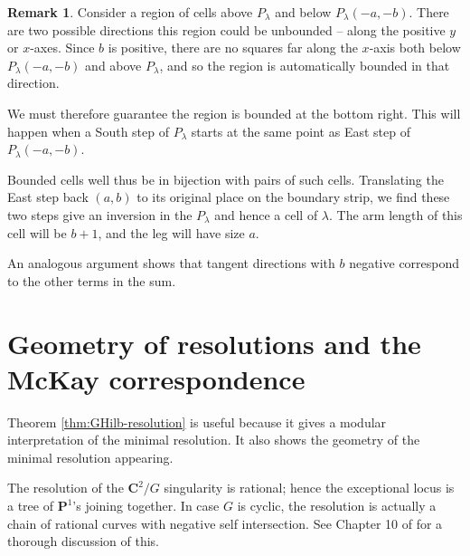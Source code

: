 \documentclass{amsart}[12pt]
\theoremstyle{definition}
\newtheorem{remark}[dummy]{Remark}
\newcommand{\C}{\mathbf{C}}
\newcommand{\proj}{\mathbf{P}}
\begin{document}
\begin{remark}
Consider a region of cells above $P_\lambda$ and below $P_\lambda(-a,-b)$.  There are two possible directions this region could be unbounded -- along the positive $y$ or $x$-axes.  Since $b$ is positive, there are no squares far along the $x$-axis both below $P_\lambda(-a,-b)$  and above $P_\lambda$, and so the region is automatically bounded in that direction.  

We must therefore guarantee the region is bounded at the bottom right.  This will happen when a South step of $P_\lambda$ starts at the same point as East step of $P_\lambda(-a,-b)$.  




Bounded cells well thus be in bijection with pairs of such cells.  Translating the East step back $(a,b)$ to its original place on the boundary strip, we find these two steps give an inversion in the $P_\lambda$ and hence a cell of $\lambda$.  The arm length of this cell will be $b+1$, and the leg will have size $a$. 

An analogous argument shows that tangent directions with $b$ negative correspond to the other terms in the sum.

\section{Geometry of resolutions and the McKay correspondence}


Theorem \ref{thm:GHilb-resolution} is useful because it gives a modular interpretation of the minimal resolution.  It also shows the geometry of the minimal resolution appearing.

The resolution of the $\C^2/G$ singularity is rational; hence the exceptional locus is a tree of $\proj^1$'s joining together.  In case $G$ is cyclic, the resolution is actually a chain of rational curves with negative self intersection.  See Chapter 10 of \cite{toric} for a thorough discussion of this.

\begin{center}
\end{center}


\end{remark}
\end{document}
